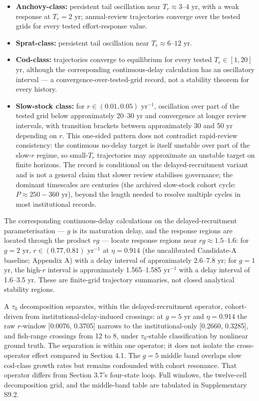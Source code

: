 \documentclass[11pt]{article}
\providecommand{\tightlist}{\setlength{\itemsep}{0pt}\setlength{\parskip}{0pt}}
\begin{document}
\begin{itemize}
\tightlist
\item
  \textbf{Anchovy-class:} persistent tail oscillation near
  \(T_r\approx 3\)--\(4\) yr, with a weak response at \(T_r=2\) yr;
  annual-review trajectories converge over the tested grids for every
  tested effort-response value.
\item
  \textbf{Sprat-class:} persistent tail oscillation near
  \(T_r\approx 6\)--\(12\) yr.
\item
  \textbf{Cod-class:} trajectories converge to equilibrium for every
  tested \(T_r\in[1,20]\) yr, although the corresponding
  continuous-delay calculation has an oscillatory interval --- a
  convergence-over-tested-grid record, not a stability theorem for every
  history.
\item
  \textbf{Slow-stock class:} for \(r\in(0.01,0.05)\) yr\(^{-1}\),
  oscillation over part of the tested grid below approximately 20--30 yr
  and convergence at longer review intervals, with transition brackets
  between approximately 30 and 50 yr depending on \(r\). This one-sided
  pattern does not contradict rapid-review consistency: the continuous
  no-delay target is itself unstable over part of the slow-\(r\) regime,
  so small-\(T_r\) trajectories may approximate an unstable target on
  finite horizons. The record is conditional on the delayed-recruitment
  variant and is not a general claim that slower review stabilises
  governance; the dominant timescales are centuries (the archived slow-stock cohort cycle: \(P \approx 250{-}360\) yr), beyond the length
  needed to resolve multiple cycles in most institutional records.
\end{itemize}

The corresponding continuous-delay calculations on the
delayed-recruitment parameterisation --- \(g\) is its maturation delay,
and the response regions are located through the product \(rg\) ---
locate response regions near \(rg\approx 1.5\)--\(1.6\): for \(g=2\) yr,
\(r\in(0.77,0.81)\) yr\(^{-1}\) at \(\eta=0.914\) (the uncalibrated Candidate-A baseline; Appendix A) with a delay interval
of approximately 2.6--7.8 yr; for \(g=1\) yr, the high-\(r\) interval is
approximately 1.565--1.585 yr\(^{-1}\) with a delay interval of 1.6--3.5
yr. These are finite-grid trajectory summaries, not closed analytical
stability regions.

A \(\tau_0\) decomposition separates, within the delayed-recruitment
operator, cohort-driven from institutional-delay-induced crossings: at
\(g = 5\) yr and \(\eta = 0.914\) the raw \(r\)-window [0.0076, 0.3705]
narrows to the institutional-only [0.2660, 0.3285], and fish-range
crossings from 12 to 8, under \(\tau_0\)-stable classification by
nonlinear ground truth. The separation is within one operator; it does
not isolate the cross-operator effect compared in Section 4.1. The
\(g = 5\) middle band overlaps slow cod-class growth rates but remains
confounded with cohort resonance. That operator differs from Section
3.7's four-state loop. Full windows, the twelve-cell decomposition grid,
and the middle-band table are tabulated in Supplementary S9.2.
\end{document}
